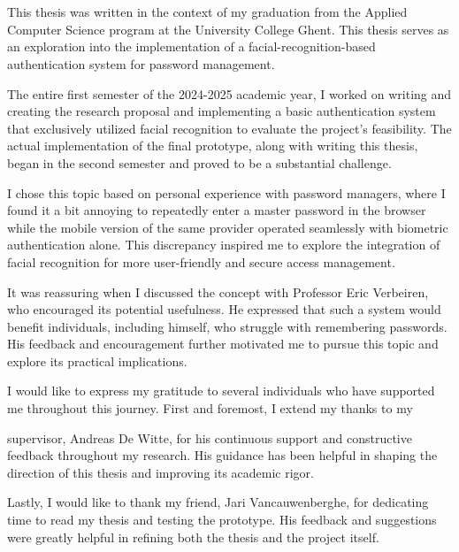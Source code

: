 
\chapter*{}%
\label{ch:voorwoord}


This thesis was written in the context of my graduation from the Applied Computer Science program at the University College Ghent. This thesis serves as an exploration into the implementation of a facial-recognition-based authentication system for password management.

The entire first semester of the 2024-2025 academic year, I worked on writing and creating the research proposal and implementing a basic authentication system that exclusively utilized facial recognition to evaluate the project's feasibility. The actual implementation of the final prototype, along with writing this thesis, began in the second semester and proved to be a substantial challenge.

I chose this topic based on personal experience with password managers, where I found it a bit annoying to repeatedly enter a master password in the browser while the mobile version of the same provider operated seamlessly with biometric authentication alone. This discrepancy inspired me to explore the integration of facial recognition for more user-friendly and secure access management.

It was reassuring when I discussed the concept with Professor Eric Verbeiren, who encouraged its potential usefulness. He expressed that such a system would benefit individuals, including himself, who struggle with remembering passwords. His feedback and encouragement further motivated me to pursue this topic and explore its practical implications.

I would like to express my gratitude to several individuals who have supported me throughout this journey. First and foremost, I extend my thanks to my 

supervisor, Andreas De Witte, for his continuous support and constructive feedback throughout my research. His guidance has been helpful in shaping the direction of this thesis and improving its academic rigor.

Lastly, I would like to thank my friend, Jari Vancauwenberghe, for dedicating time to read my thesis and testing the prototype. His feedback and suggestions were greatly helpful in refining both the thesis and the project itself.
